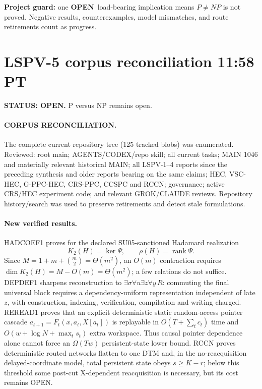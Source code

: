 \documentclass[11pt]{article}
\newcommand{\statusopen}{\textcolor{openstatus}{\textbf{OPEN}}}
\begin{document}
\vfill
\begin{center}
\small
\textbf{Project guard:} one \statusopen\ load-bearing implication means \(P\neq NP\) is not proved.
Negative results, counterexamples, model mismatches, and route retirements count as progress.
\end{center}

\section{LSPV-5 corpus reconciliation 11:58 PT}
\textbf{STATUS: OPEN.} P versus NP remains open.

\paragraph{CORPUS RECONCILIATION.} The complete current repository tree (125 tracked blobs) was enumerated. Reviewed: root main; AGENTS/CODEX/repo skill; all current tasks; MAIN 1046 and materially relevant historical MAIN; all LSPV-1--4 reports since the preceding synthesis and older reports bearing on the same claims; HEC, VSC-HEC, G-PPC-HEC, CRS-PPC, CCSPC and RCCN; governance; active CRS/HEC experiment code; and relevant GROK/CLAUDE reviews. Repository history/search was used to preserve retirements and detect stale formulations.

\paragraph{New verified results.} HADCOEF1 proves for the declared SU05-sanctioned Hadamard realization
\[
\boxed{K_2(H)=\ker\Psi,\qquad \rho(H)=\operatorname{rank}\Psi}.
\]
Since \(M=1+m+\binom m2=\Theta(m^2)\), an \(O(m)\) contraction requires \(\dim K_2(H)=M-O(m)=\Theta(m^2)\); a few relations do not suffice. DEPDEF1 sharpens reconstruction to \(\exists\sigma\forall u\exists z\forall y\,R\): commuting the final universal block requires a dependency-uniform representation independent of late \(z\), with construction, indexing, verification, compilation and writing charged. REREAD1 proves that an explicit deterministic static random-access pointer cascade \(a_{t+1}=F_t(x,a_t,X[a_t])\) is replayable in \(O(T+\sum_t c_t)\) time and \(O(w+\log N+\max_t s_t)\) extra workspace. Thus causal pointer dependence alone cannot force an \(\Omega(Tw)\) persistent-state lower bound. RCCN proves deterministic routed networks flatten to one DTM and, in the no-reacquisition delayed-coordinate model, total persistent state obeys \(s\ge K-r\); below this threshold some post-cut X-dependent reacquisition is necessary, but its cost remains OPEN.
\end{document}

